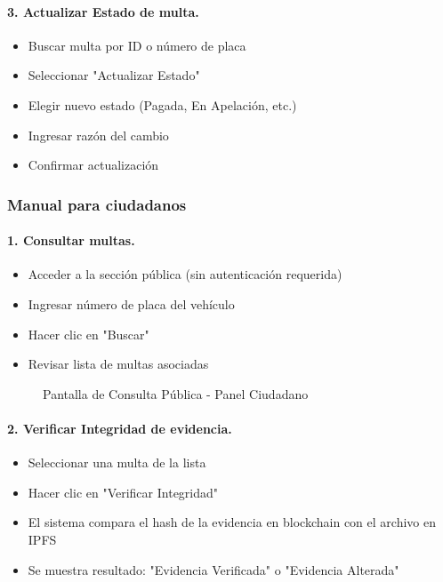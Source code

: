 \paragraph{3. Actualizar Estado de multa.}
\begin{itemize}
    \item Buscar multa por ID o número de placa
    \item Seleccionar "Actualizar Estado"
    \item Elegir nuevo estado (Pagada, En Apelación, etc.)
    \item Ingresar razón del cambio
    \item Confirmar actualización
\end{itemize}

\subsubsection{Manual para ciudadanos}

\paragraph{1. Consultar multas.}
\begin{itemize}
    \item Acceder a la sección pública (sin autenticación requerida)
    \item Ingresar número de placa del vehículo
    \item Hacer clic en "Buscar"
    \item Revisar lista de multas asociadas
\end{itemize}

\begin{figure}[htbp]
    \centering
    \caption{Pantalla de Consulta Pública - Panel Ciudadano}
\end{figure}

\paragraph{2. Verificar Integridad de evidencia.}
\begin{itemize}
    \item Seleccionar una multa de la lista
    \item Hacer clic en "Verificar Integridad"
    \item El sistema compara el hash de la evidencia en blockchain 
          con el archivo en IPFS
    \item Se muestra resultado: "Evidencia Verificada" o 
          "Evidencia Alterada"
\end{itemize}

